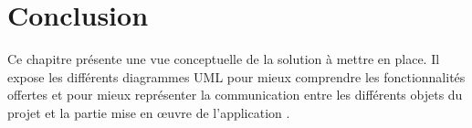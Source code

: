 \section{Conclusion}

Ce chapitre présente une vue conceptuelle de la solution à mettre en place. Il expose les différents diagrammes UML pour mieux comprendre les fonctionnalités offertes et pour mieux représenter la communication entre les différents objets du projet et la partie mise en œuvre de l’application .


